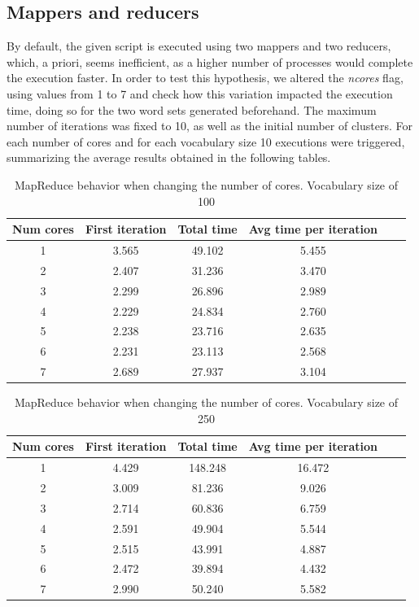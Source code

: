 \subsection{Mappers and reducers}

By default, the given script is executed using two mappers and two reducers, which, a priori, seems inefficient, as a higher number of processes would complete the execution faster. In order to test this hypothesis, we altered the \textit{ncores} flag, using values from 1 to 7 and check how this variation impacted the execution time, doing so for the two word sets generated beforehand. The maximum number of iterations was fixed to 10, as well as the initial number of clusters. For each number of cores and for each vocabulary size 10 executions were triggered, summarizing the average results obtained in the following tables.

\begin{table}
\begin{tabular}{||c c c c c c||}
 \hline
 Num cores & First iteration & Total time & Avg time per iteration\\ [0.5ex]
 \hline\hline
 1 & 3.565 & 49.102 & 5.455 \\
 \hline
 2 & 2.407 & 31.236 & 3.470  \\
 \hline
 3 & 2.299 & 26.896 & 2.989 \\
 \hline
 4 & 2.229 & 24.834 & 2.760 \\
 \hline
 5 & 2.238 & 23.716 & 2.635 \\
 \hline
 6 & 2.231 & 23.113 & 2.568 \\
 \hline
 7 & 2.689 & 27.937 & 3.104 \\
 \hline
\end{tabular}
\caption{MapReduce behavior when changing the number of cores. Vocabulary size of 100}
\end{table}

\begin{table}
\begin{tabular}{||c c c c c c||}
 \hline
 Num cores & First iteration & Total time & Avg time per iteration\\ [0.5ex]
 \hline\hline
 1 & 4.429 & 148.248 & 16.472 \\
 \hline
 2 & 3.009 & 81.236 & 9.026  \\
 \hline
 3 & 2.714 & 60.836 & 6.759 \\
 \hline
 4 & 2.591 & 49.904 & 5.544 \\
 \hline
 5 & 2.515 & 43.991 & 4.887 \\
 \hline
 6 & 2.472 & 39.894 & 4.432 \\
 \hline
 7 & 2.990 & 50.240 & 5.582 \\
 \hline
\end{tabular}
\caption{MapReduce behavior when changing the number of cores. Vocabulary size of 250}
\end{table}

